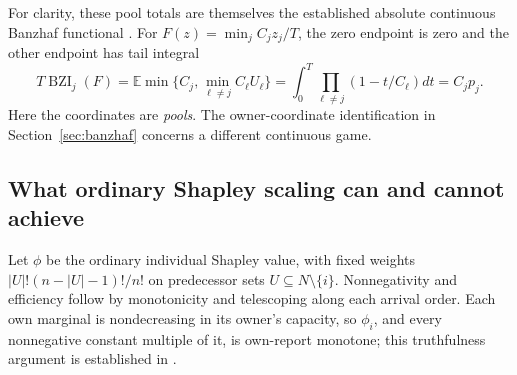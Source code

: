 \documentclass[11pt]{article}
\theoremstyle{definition}\newtheorem{definition}[theorem]{Definition}
\theoremstyle{remark}\newtheorem{remark}[theorem]{Remark}
\newcommand{\E}{\mathbb E}
\begin{document}
For clarity, these pool totals are themselves the established absolute
continuous Banzhaf functional \cite[Definition~6.11]{Kurz}. For
$F(z)=\min_j C_jz_j/T$, the zero endpoint is zero and the other endpoint
has tail integral
\[
 T\operatorname{BZI}_j(F)
 =\E\min\{C_j,\min_{\ell\ne j}C_\ell U_\ell\}
 =\int_0^T\prod_{\ell\ne j}(1-t/C_\ell)dt=C_jp_j.
\]
Here the coordinates are \emph{pools}. The owner-coordinate identification
in Section~\ref{sec:banzhaf} concerns a different continuous game.

\subsection{What ordinary Shapley scaling can and cannot achieve}
Let $\phi$ be the ordinary individual Shapley value, with fixed weights
$|U|!(n-|U|-1)!/n!$ on predecessor sets $U\subseteq N\setminus\{i\}$.
Nonnegativity and efficiency follow by monotonicity and telescoping along
each arrival order. Each own marginal is nondecreasing in its owner's
capacity, so $\phi_i$, and every nonnegative constant multiple of it, is
own-report monotone; this truthfulness argument is established in
\cite[Proposition~1]{Huang}.
\end{document}
